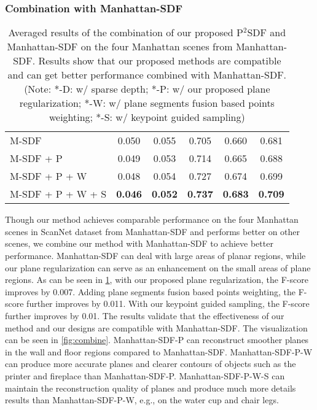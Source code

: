 \documentclass[10pt,journal,compsoc]{IEEEtran}
\begin{document}
\subsubsection{Combination with Manhattan-SDF}
\begin{table}[htbp]
	\centering
	\caption{Averaged results of the combination of our proposed P$^2$SDF and Manhattan-SDF \cite{guo2022neural} on the four Manhattan scenes from Manhattan-SDF. Results show that our proposed methods are compatible and can get better performance combined with Manhattan-SDF. (Note: *-D: w/ sparse depth; *-P: w/ our proposed plane regularization; *-W: w/ plane segments fusion based points weighting; *-S: w/ keypoint guided sampling)}
	\begin{tabular}{l|ccccc}
		\toprule
		\makebox[0.1\linewidth][l]{Method} & \makebox[0.09\linewidth][c]{Acc $\downarrow$} & \makebox[0.09\linewidth][c]{Comp $\downarrow$} & \makebox[0.09\linewidth][c]{Prec $\uparrow$} & \makebox[0.09\linewidth][c]{Recall $\uparrow$} & \makebox[0.09\linewidth][c]{\textbf{F-score} $\uparrow$} \\
		\midrule
		M-SDF & 0.050  & 0.055 & 0.705 & 0.660 & 0.681 \\
		M-SDF + P & 0.049 & 0.053 & 0.714 & 0.665 & 0.688 \\
		M-SDF + P + W & 0.048 & 0.054 & 0.727 & 0.674 & 0.699 \\
		M-SDF + P + W + S & \textbf{0.046} & \textbf{0.052} & \textbf{0.737} & \textbf{0.683} & \textbf{0.709} \\
		\bottomrule
	\end{tabular}
	\label{tab:combine}
\end{table}
Though our method achieves comparable performance on the four Manhattan scenes  in ScanNet dataset from Manhattan-SDF \cite{guo2022neural} and performs better on other scenes, we combine our method with Manhattan-SDF to achieve better performance. Manhattan-SDF can deal with large areas of planar regions, while our plane regularization can serve as an enhancement on the small areas of plane regions. As can be seen in \cref{tab:combine}, with our proposed plane regularization, the F-score improves by 0.007. Adding plane segments fusion based points weighting, the F-score further improves by 0.011. With our keypoint guided sampling, the F-score further improves by 0.01. The results validate that the effectiveness of our method and our designs are compatible with Manhattan-SDF. The visualization can be seen in \cref{fig:combine}. Manhattan-SDF-P can reconstruct smoother planes in the wall and floor regions compared to Manhattan-SDF. Manhattan-SDF-P-W can produce more accurate planes and clearer contours of objects such as the printer and fireplace than Manhattan-SDF-P. Manhattan-SDF-P-W-S can maintain the reconstruction quality of planes and produce much more details results than Manhattan-SDF-P-W, e.g., on the water cup and chair legs.
\end{document}
